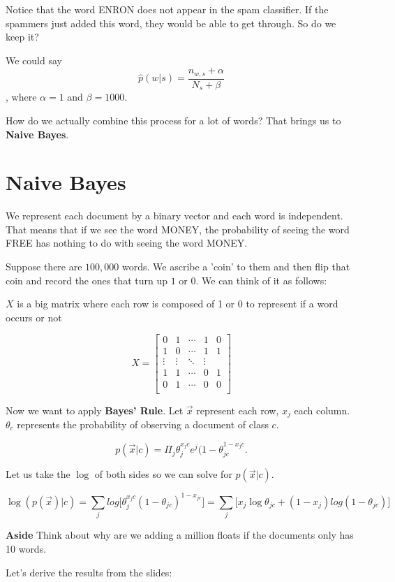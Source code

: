 Notice that the word ENRON does not appear in the spam classifier. If the spammers just added this word, they would be able to get through. So do we keep it?

We could say $$\hat{p}(w|s) = \frac{n_{w, s} + \alpha}{N_{s} + \beta}$$, where $\alpha = 1$ and $\beta = 1000$.

How do we actually combine this process for a lot of words? That brings us to \textbf{Naive Bayes}. 

\section{Naive Bayes}

We represent each document by a binary vector and each word is independent. That means that if we see the word MONEY, the probability of seeing the word FREE has nothing to do with seeing the word MONEY.

Suppose there are $100,000$ words. We ascribe a 'coin' to them and then flip that coin and record the ones that turn up $1$ or $0$. We can think of it as follows:

$X$ is a big matrix where each row is composed of 1 or 0 to represent if a word occurs or not 

$$X =
\begin{bmatrix}
  0 & 1& \cdots &1 & 0 \\
  1 & 0& \cdots &1 & 1 \\
  \vdots & \vdots & \ddots & \vdots\\
  1 & 1& \cdots &0 & 1 \\
  0 & 1& \cdots &0 & 0 \\
\end{bmatrix}
$$

Now we want to apply \textbf{Bayes' Rule}. Let $\vec{x}$ represent each row, $x_j$ each column. $\theta_c$ represents the probability of observing a document of class $c$. 

$$p(\vec{x}|c) = \Pi_j \theta^{x_jc}_j e^j ( 1- \theta_{jc}^{1-x_jc}.$$

Let us take the $\log$ of both sides so we can solve for $p(\vec{x} | c)$.

$$\log(p(\vec{x})|c) = \sum_j log\bigg[ \theta^{x_jc}_j ( 1 - \theta_{jc})^{1-x_{jc}}\bigg] = \sum_j \Bigg[ x_j \log\theta_{jc} + (1 - x_j) log(1 - \theta_{jc}) \Bigg]$$

\textbf{Aside} Think about why are we adding a million floats if the documents only has 10 words. 

Let's derive the results from the slides:


